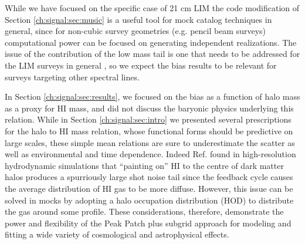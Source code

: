 While we have focused on the specific case of 21 cm LIM the code modification of Section \ref{ch:signal:sec:music} is a useful tool for mock catalog techniques in general, since for non-cubic survey geometries (e.g. pencil beam surveys) computational power can be focused on generating independent realizations. The issue of the contribution of the low mass tail is one that needs to be addressed for the LIM surveys in general \citep{statusreport}, so we expect the bias results to be relevant for surveys targeting other spectral lines.

In Section \ref{ch:signal:sec:results}, we focused on the bias as a function of halo mass as a proxy for HI mass, and did not discuss the baryonic physics underlying this relation. While in Section \ref{ch:signal:sec:intro} we presented several prescriptions for the halo to HI mass relation, whose functional forms should be predictive on large scales, these simple mean relations are sure to underestimate the scatter as well as environmental and time dependence. Indeed Ref. \cite{illustristng21cm} found in high-resolution hydrodynamic simulations that ``painting on'' HI to the centre of dark matter halos produces a spurriously large shot noise tail since the feedback cycle causes the average distribution of HI gas to be more diffuse. However, this issue can be solved in mocks by adopting a halo occupation distribution (HOD) \citep{maneraetal2013} to distribute the gas around some profile. These considerations, therefore, demonstrate the power and flexibility of the Peak Patch plus subgrid approach for modeling and fitting a wide variety of cosmological and astrophysical effects.